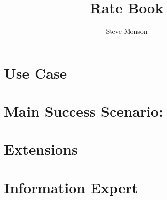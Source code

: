 \documentclass{article}
\title{Rate Book}
\author{Steve Monson}
\begin{document}
\maketitle

\section*{Use Case}

\section*{Main Success Scenario:}

\section*{Extensions}

\section*{Information Expert}
\end{document}
